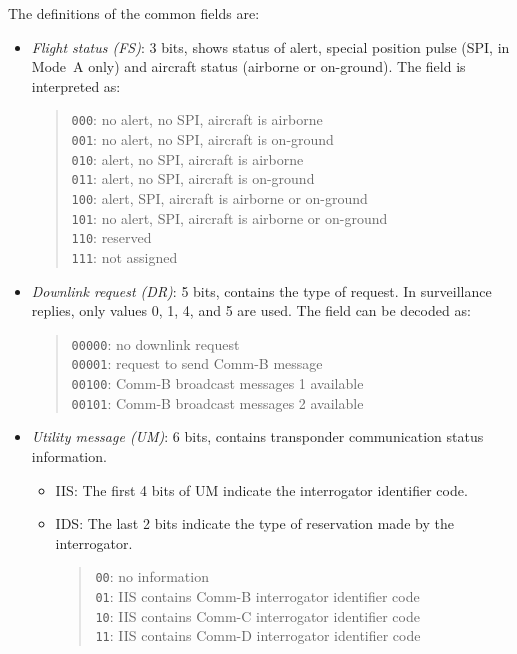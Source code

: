 The definitions of the common fields are:

\begin{itemize}
  \item \emph{Flight status (FS)}: 3 bits, shows status of alert, special position pulse (SPI, in Mode~A only) and aircraft status (airborne or on-ground). The field is interpreted as:

  \begin{quote}
    \small
    \texttt{000}: no alert, no SPI, aircraft is airborne \\
    \texttt{001}: no alert, no SPI, aircraft is on-ground \\
    \texttt{010}: alert, no SPI, aircraft is airborne \\
    \texttt{011}: alert, no SPI, aircraft is on-ground \\
    \texttt{100}: alert, SPI, aircraft is airborne or on-ground \\
    \texttt{101}: no alert, SPI, aircraft is airborne or on-ground \\
    \texttt{110}: reserved \\
    \texttt{111}: not assigned
  \end{quote}

  \item \emph{Downlink request (DR)}: 5 bits, contains the type of request. In surveillance replies, only values 0, 1, 4, and 5 are used. The field can be decoded as:

  \begin{quote}
    \small
    \texttt{00000}: no downlink request \\
    \texttt{00001}: request to send Comm-B message \\
    \texttt{00100}: Comm-B broadcast messages 1 available \\
    \texttt{00101}: Comm-B broadcast messages 2 available
  \end{quote}

  \item \emph{Utility message (UM)}: 6 bits, contains transponder communication status information. 
  
  \begin{itemize}
    \item IIS: The first 4 bits of UM indicate the interrogator identifier code. 
    \item IDS: The last 2 bits indicate the type of reservation made by the interrogator.

    \begin{quote}
      \small
      \texttt{00}: no information \\
      \texttt{01}: IIS contains Comm-B interrogator identifier code \\
      \texttt{10}: IIS contains Comm-C interrogator identifier code \\
      \texttt{11}: IIS contains Comm-D interrogator identifier code \\
    \end{quote}
  
  \end{itemize}

  


\end{itemize}
